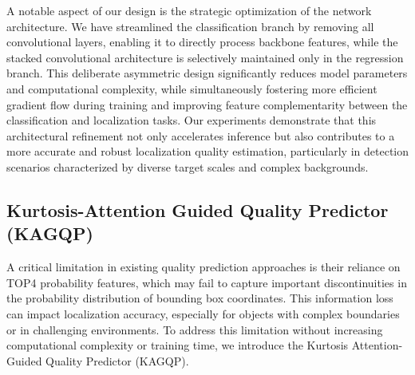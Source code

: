 
A notable aspect of our design is the strategic optimization of the network architecture. We have streamlined the classification branch by removing all convolutional layers, enabling it to directly process backbone features, while the stacked convolutional architecture is selectively maintained only in the regression branch. This deliberate asymmetric design significantly reduces model parameters and computational complexity, while simultaneously fostering more efficient gradient flow during training and improving feature complementarity between the classification and localization tasks. Our experiments demonstrate that this architectural refinement not only accelerates inference but also contributes to a more accurate and robust localization quality estimation, particularly in detection scenarios characterized by diverse target scales and complex backgrounds.


\subsection{ Kurtosis-Attention Guided Quality Predictor (KAGQP)}
A critical limitation in existing quality prediction approaches is their reliance on TOP4 probability features, which may fail to capture important discontinuities in the probability distribution of bounding box coordinates. This information loss can impact localization accuracy, especially for objects with complex boundaries or in challenging environments. To address this limitation without increasing computational complexity or training time, we introduce the Kurtosis Attention-Guided Quality Predictor (KAGQP).


